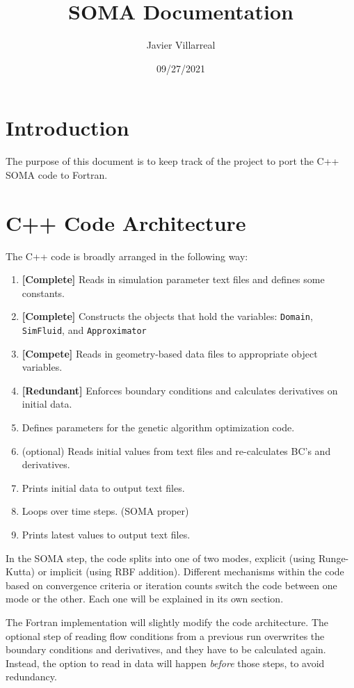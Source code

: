 \documentclass[12pt]{article}
\begin{document}
    \title{SOMA Documentation}
    \author{Javier Villarreal}
    \date{09/27/2021}
    \maketitle

    \section{Introduction}
        The purpose of this document is to keep track of the project to port the C++ SOMA code to Fortran.

    \section{C++ Code Architecture}
        The C++ code is broadly arranged in the following way:
        \begin{enumerate}
            \item \textbf{[Complete]} Reads in simulation parameter text files and defines some constants.
            \item \textbf{[Complete]} Constructs the objects that hold the variables: \texttt{Domain}, \texttt{SimFluid}, and \texttt{Approximator}
            \item \textbf{[Compete]} Reads in geometry-based data files to appropriate object variables.
            \item \textbf{[Redundant]} Enforces boundary conditions and calculates derivatives on initial data.
            \item Defines parameters for the genetic algorithm optimization code.
            \item (optional) Reads initial values from text files and re-calculates BC's and derivatives.
            \item Prints initial data to output text files.
            \item Loops over time steps. (SOMA proper)
            \item Prints latest values to output text files.
        \end{enumerate}
        In the SOMA step, the code splits into one of two modes, explicit (using Runge-Kutta) or implicit (using RBF addition). Different mechanisms within the code based on convergence criteria or iteration counts switch the code between one mode or the other. Each one will be explained in its own section.

        The Fortran implementation will slightly modify the code architecture. The optional step of reading flow conditions from a previous run overwrites the boundary conditions and derivatives, and they have to be calculated again. Instead, the option to read in data will happen \textit{before} those steps, to avoid redundancy.
    
\end{document}
